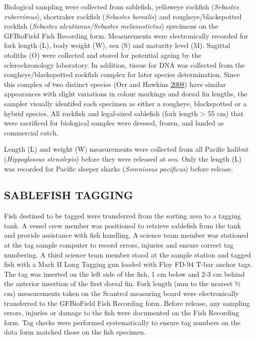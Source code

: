 \documentclass[12pt]{article}\usepackage[]{graphicx}\usepackage[]{color}
\begin{document}
Biological sampling were collected from sablefish, yelloweye rockfish (\emph{Sebastes ruberrimus}), shortraker rockfish (\emph{Sebastes borealis}) and rougheye/blackspotted rockfish (\emph{Sebastes aleutianus/Sebastes melanostictus}) specimens on the GFBioField Fish Recording form. Measurements were electronically recorded for fork length (L), body weight (W), sex (S) and maturity level (M). Sagittal otoliths (O) were collected and stored for potential ageing by the sclerochronology laboratory. In addition, tissue for DNA was collected from the rougheye/blackspotted rockfish complex for later species determination. Since this complex of two distinct species (Orr and Hawkins \protect\hyperlink{ref-Orr2008}{2008}) have similar appearances with slight variations in colour markings and dorsal fin lengths, the sampler visually identifed each specimen as either a rougheye, blackspotted or a hybrid species. All rockfish and legal-sized sablefish (fork length \textgreater{} 55 cm) that were sacrificed for biological samples were dressed, frozen, and landed as commercial catch.

Length (L) and weight (W) measurements were collected from all Pacific halibut (\emph{Hippoglossus stenolepis}) before they were released at sea. Only the length (L) was recorded for Pacific sleeper sharks (\emph{Somniosus pacificus}) before release.

\hypertarget{sablefish-tagging}{%
\subsection{SABLEFISH TAGGING}\label{sablefish-tagging}}

Fish destined to be tagged were transferred from the sorting area to a tagging tank. A vessel crew member was positioned to retrieve sablefish from the tank and provide assistance with fish handling. A science team member was stationed at the tag sample computer to record errors, injuries and ensure correct tag numbering. A third science team member stood at the sample station and tagged fish with a Mark II Long Tagging gun loaded with Floy FD-94 T-bar anchor tags. The tag was inserted on the left side of the fish, 1 cm below and 2-3 cm behind the anterior insertion of the first dorsal fin. Fork length (mm to the nearest ½ cm) measurements taken on the Scantrol measuring board were electronically transferred to the GFBioField Fish Recording form. Before release, any sampling errors, injuries or damage to the fish were documented on the Fish Recording form. Tag checks were performed systematically to ensure tag numbers on the data form matched those on the fish specimen.
\end{document}
